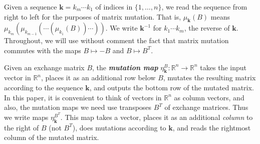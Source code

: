 \documentclass{amsart}
\theoremstyle{definition}
\theoremstyle{remark}
\numberwithin{equation}{section}
\newcommand{\newword}[1]{\textbf{\emph{#1}}}
\newcommand{\reals}{\mathbb R}
\newcommand{\set}[1]{{\lbrace #1 \rbrace}}
\newcommand{\0}{{\mathbf{0}}}
\newcommand{\kk}{\mathbf{k}}
\begin{document}
Given a sequence $\kk=k_m\cdots k_1$ of indices in $\set{1,\ldots,n}$, we read the sequence from right to left for the purposes of matrix mutation.
That is, $\mu_\kk(B)$ means $\mu_{k_m}(\mu_{k_{m-1}}(\cdots(\mu_{k_1}(B))\cdots))$.
We write $\kk^{-1}$ for $k_1\cdots k_m$, the reverse of $\kk$.
Throughout, we will use without comment the fact that matrix mutation commutes with the maps $B\mapsto-B$ and $B\mapsto B^T$.

Given an exchange matrix $B$, the \newword{mutation map} $\eta^B_\kk:\reals^n\to\reals^n$ takes the input vector in $\reals^n$, places it as an additional row below $B$, mutates the resulting matrix according to the sequence $\kk$, and outputs the bottom row of the mutated matrix.
In this paper, it is convenient to think of vectors in $\reals^n$ as column vectors, and also, the mutation maps we need use transposes $B^T$ of exchange matrices.
Thus we write maps $\eta_\kk^{B^T}$.
This map takes a vector, places it as an additional \emph{column} to the right of $B$ (not $B^T$), does mutations according to $\kk$, and reads the rightmost column of the mutated matrix.
\end{document}
